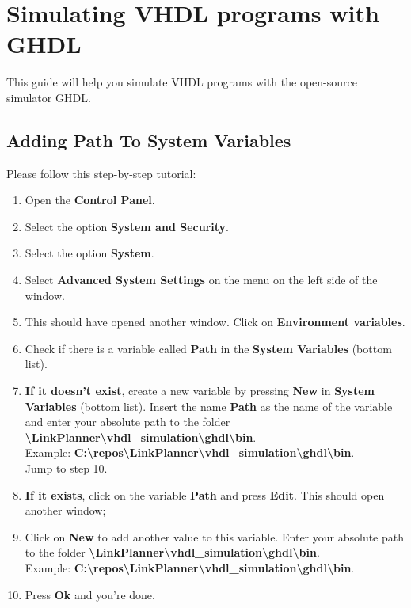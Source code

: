 \chapter{Simulating VHDL programs with GHDL}

This guide will help you simulate VHDL programs with the open-source simulator GHDL.

\section{Adding Path To System Variables}
Please follow this step-by-step tutorial:
  \begin{enumerate}
    \item Open the \textbf{Control Panel}.
    \item Select the option \textbf{System and Security}.
    \item Select the option \textbf{System}.
    \item Select \textbf{Advanced System Settings} on the menu on the left side of the window.
    \item This should have opened another window. Click on \textbf{Environment variables}.
    \item Check if there is a variable called \textbf{Path} in the \textbf{System Variables} (bottom list).
    \item \textbf{If it doesn't exist}, create a new variable by pressing \textbf{New} in \textbf{System Variables} (bottom list). Insert the name \textbf{Path} as the name of the variable and enter your absolute path to the folder \textbf{\textbackslash{}LinkPlanner\textbackslash{}vhdl\_simulation\textbackslash{}ghdl\textbackslash{}bin}.\\ Example:
        \textbf{C:\textbackslash{}repos\textbackslash{}LinkPlanner\textbackslash{}vhdl\_simulation\textbackslash{}ghdl\textbackslash{}bin}.\\
          Jump to step 10.
    \item \textbf{If it exists}, click on the variable \textbf{Path} and press \textbf{Edit}. This should open another window;
    \item Click on \textbf{New} to add another value to this variable. Enter your absolute path to the folder \textbf{\textbackslash{}LinkPlanner\textbackslash{}vhdl\_simulation\textbackslash{}ghdl\textbackslash{}bin}.\\ Example:
        \textbf{C:\textbackslash{}repos\textbackslash{}LinkPlanner\textbackslash{}vhdl\_simulation\textbackslash{}ghdl\textbackslash{}bin}.\\
    \item Press \textbf{Ok} and you're done.
  \end{enumerate}
\pagebreak
